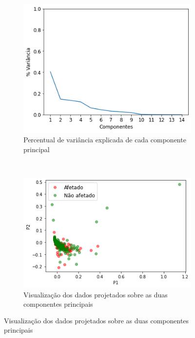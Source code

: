 \begin{figure}[htb] 
    \centering 
    \caption{PCA sobre dados totais de CNAEs}
    \label{fig:resultados:base-de-dados-28-pca-components-total-cnae} 
    \begin{subfigure}[b]{0.45\textwidth}
        \includegraphics[scale=0.45]{images/base-de-dados-28.1-pca-components-total-cnae.png}
        \caption{Percentual de variância explicada de cada componente principal}
        \label{fig:resultados:base-de-dados-28.1-pca-components-total-cnae}
    \end{subfigure} ~ \quad
    \begin{subfigure}[b]{0.45\textwidth}
        \includegraphics[scale=0.45]{images/base-de-dados-28.2-pca-2d-total-cnae.png}
        \caption{Visualização dos dados projetados sobre as duas componentes principais}
        \label{fig:resultados:base-de-dados-28.2-pca-2d-total-cnae}
    \end{subfigure}
    \fdadospesquisa
\end{figure}

